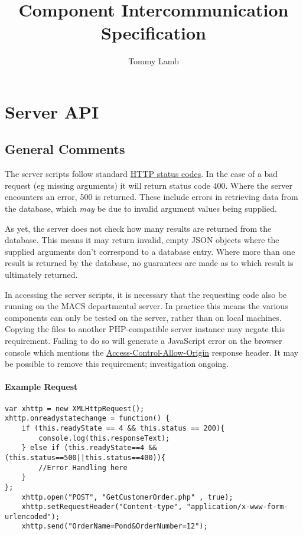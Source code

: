 \documentclass[12pt, a4paper]{article}
\begin{document}
\title{Component Intercommunication Specification}
\author{Tommy Lamb}

\maketitle

\tableofcontents
\pagebreak


\section{Server API}

\subsection{General Comments}

The server scripts follow standard \href{https://en.wikipedia.org/wiki/List_of_HTTP_status_codes}{HTTP status codes}. In the case of a bad request (eg missing arguments) it will return status code 400. Where the server encounters an error, 500 is returned. These include errors in retrieving data from the database, which \textit{may} be due to invalid argument values being supplied.

As yet, the server does not check how many results are returned from the database. This means it may return invalid, empty JSON objects where the supplied arguments don't correspond to a database entry. Where more than one result is returned by the database, no guarantees are made as to which result is ultimately returned.

In accessing the server scripts, it is necessary that the requesting code also be running on the MACS departmental server. In practice this means the various components can only be tested on the server, rather than on local machines. Copying the files to another PHP-compatible server instance may negate this requirement. Failing to do so will generate a JavaScript error on the browser console which mentions the \href{https://developer.mozilla.org/en-US/docs/Web/HTTP/Headers/Access-Control-Allow-Origin}{Access-Control-Allow-Origin} response header. It may be possible to remove this requirement; investigation ongoing.

\paragraph{Example Request}
\begin{verbatim}
var xhttp = new XMLHttpRequest();
xhttp.onreadystatechange = function() {
	if (this.readyState == 4 && this.status == 200){
		console.log(this.responseText);
	} else if (this.readyState==4 && (this.status==500||this.status==400)){
		//Error Handling here
	}
};
	xhttp.open("POST", "GetCustomerOrder.php" , true);
	xhttp.setRequestHeader("Content-type", "application/x-www-form-urlencoded");
	xhttp.send("OrderName=Pond&OrderNumber=12");
\end{verbatim}
\end{document}
